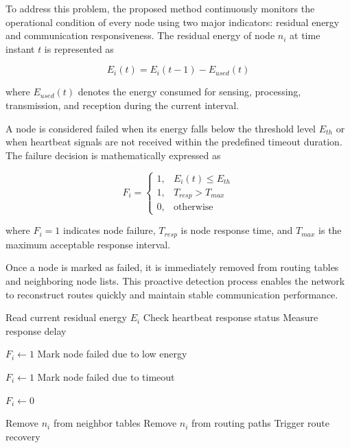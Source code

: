 \documentclass[a4paper,fleqn]{cas-dc}
\numberwithin{equation}{section}
\begin{document}
To address this problem, the proposed method continuously monitors the operational condition of every node using two major indicators: residual energy and communication responsiveness. The residual energy of node $n_i$ at time instant $t$ is represented as

\begin{equation}
E_i(t)=E_i(t-1)-E_{used}(t)
\end{equation}

where $E_{used}(t)$ denotes the energy consumed for sensing, processing, transmission, and reception during the current interval.

A node is considered failed when its energy falls below the threshold level $E_{th}$ or when heartbeat signals are not received within the predefined timeout duration. The failure decision is mathematically expressed as

\begin{equation}
F_i=
\begin{cases}
1, & E_i(t)\leq E_{th} \\
1, & T_{resp}>T_{max} \\
0, & \text{otherwise}
\end{cases}
\end{equation}

where $F_i=1$ indicates node failure, $T_{resp}$ is node response time, and $T_{max}$ is the maximum acceptable response interval.

Once a node is marked as failed, it is immediately removed from routing tables and neighboring node lists. This proactive detection process enables the network to reconstruct routes quickly and maintain stable communication performance.

\begin{algorithm}[H]
\caption{Algorithm 2: FailureDetection()}
\label{alg:fault}
\begin{algorithmic}[1]


    \STATE Read current residual energy $E_i$
    \STATE Check heartbeat response status
    \STATE Measure response delay


        \STATE $F_i \leftarrow 1$
        \STATE Mark node failed due to low energy


        \STATE $F_i \leftarrow 1$
        \STATE Mark node failed due to timeout

    \ELSE

        \STATE $F_i \leftarrow 0$

    \ENDIF


        \STATE Remove $n_i$ from neighbor tables
        \STATE Remove $n_i$ from routing paths
        \STATE Trigger route recovery

    \ENDIF

\ENDFOR

\end{algorithmic}
\end{algorithm}
\end{document}

